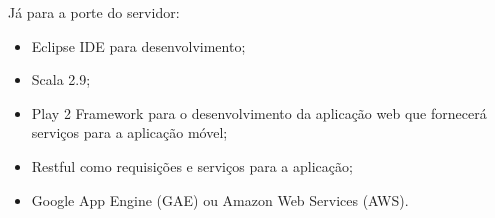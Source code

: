 \documentclass[11pt,a4paper,oneside]{article}
\begin{document}
Já para a porte do servidor:
\begin{itemize}
\item Eclipse IDE para desenvolvimento;
\item Scala 2.9;
\item Play 2 Framework para o desenvolvimento da aplicação web que fornecerá serviços para a aplicação móvel;
\item Restful como requisições e serviços para a aplicação;
\item Google App Engine (GAE) ou Amazon Web Services (AWS).
\end{itemize}

%
\end{document}
